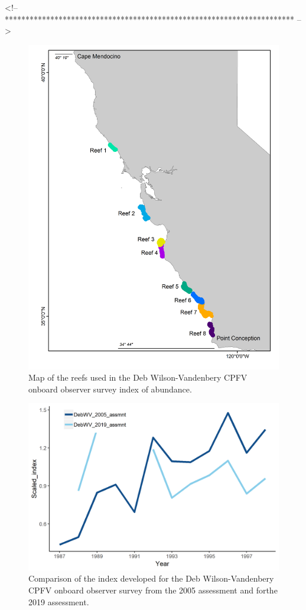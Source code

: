 \documentclass[12pt,]{article}
\begin{document}
\FloatBarrier
<!-- ********************************************************************** -->

\begin{figure}
\centering
\includegraphics{Figures/DebWV_sites.png}
\caption{Map of the reefs used in the Deb Wilson-Vandenbery CPFV onboard
observer survey index of abundance. \label{fig:DebWV_sites}}
\end{figure}

\begin{figure}
\centering
\includegraphics{Figures/DebWV_index_compare.png}
\caption{Comparison of the index developed for the Deb Wilson-Vandenbery
CPFV onboard observer survey from the 2005 assessment and forthe 2019
assessment. \label{fig:DebWV_index_compare}}
\end{figure}
\end{document}
